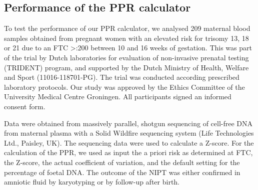\subsection{Performance of the PPR calculator}
To test the performance of our PPR calculator, we analysed 209 maternal blood samples obtained from pregnant women with an elevated risk for trisomy 13, 18 or 21 due to an FTC \textgreater{}:200 between 10 and 16 weeks of gestation. 
This was part of the trial by Dutch laboratories for evaluation of non-invasive prenatal testing (TRIDENT) program, and supported by the Dutch Ministry of Health, Welfare and Sport (11016-118701-PG). 
The trial was conducted according prescribed laboratory protocols. 
Our study was approved by the Ethics Committee of the University Medical Centre Groningen. 
All participants signed an informed consent form.

Data were obtained from massively parallel, shotgun sequencing of cell-free DNA from maternal plasma with a Solid Wildfire sequencing system (Life Technologies Ltd., Paisley, UK). 
The sequencing data were used to calculate a Z-score. 
For the calculation of the PPR, we used as input the a priori risk as determined at FTC, the Z-score, the actual coefficient of variation, and the default setting for the percentage of foetal DNA. 
The outcome of the NIPT was either confirmed in amniotic fluid by karyotyping or by follow-up after birth.